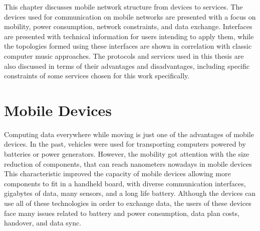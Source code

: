 This chapter discusses mobile network structure from devices to services.
The devices used for communication on mobile networks are presented with a focus on mobility, power consumption, network constraints, and data exchange.
Interfaces are presented with technical information for users intending to apply them, while the topologies formed using these interfaces are shown in correlation with classic computer music approaches.
The protocols and services used in this thesis are also discussed in terms of their advantages and disadvantages, including specific constraints of some services chosen for this work specifically.

\section{Mobile Devices}
\label{sec:mobiledevices}

Computing data everywhere while moving is just one of the advantages of mobile devices.
In the past, vehicles were used for transporting computers powered by batteries or power generators.
However, the mobility got attention with the size reduction of components, that can reach nanometers nowadays in mobile devices
This characteristic improved the capacity of mobile devices allowing more components to fit in a handheld board, with diverse communication interfaces, gigabytes of data, many sensors, and a long life battery.
Although the devices can use all of these technologies in order to exchange data, the users of these devices face many issues related to
battery and power consumption, data plan costs, handover, and data sync.

